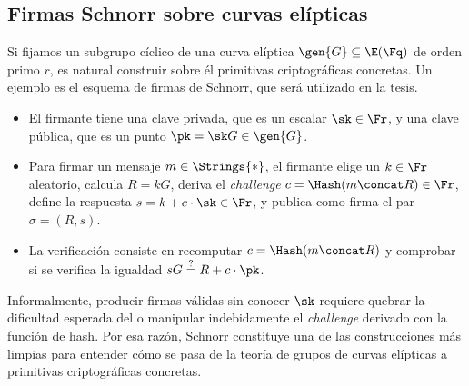 \subsection{Firmas Schnorr sobre curvas elípticas}

Si fijamos un subgrupo cíclico de una curva elíptica $\gen{G} \subseteq \E(\Fq)$ de orden primo $r$, es natural construir sobre él primitivas criptográficas concretas. Un ejemplo es el esquema de firmas de Schnorr, que será utilizado en la tesis.

\begin{itemize}[itemsep=0.1 cm]
	\item El firmante tiene una clave privada, que es un escalar $\sk \in \Fr$, y una clave pública, que es un punto $\pk = \sk G \in \gen{G}$.
	\item Para firmar un mensaje $m \in \Strings{*}$, el firmante elige un $k \in \Fr$ aleatorio, calcula
	$R = kG$, deriva el \textit{challenge} $c = \Hash(m \concat R) \in \Fr$, define la respuesta $s = k + c \cdot \sk \in \Fr$, y publica como firma el par $\sigma = (R,s)$.
	\item La verificación consiste en recomputar $c = \Hash(m \concat R)$ y comprobar si se verifica la igualdad $sG \stackrel{?}{=} R + c\cdot \pk$.
\end{itemize}

Informalmente, producir firmas válidas sin conocer $\sk$ requiere quebrar la dificultad esperada del \ECDLP o manipular indebidamente el \textit{challenge} derivado con la función de hash. Por esa razón, Schnorr constituye una de las construcciones más limpias para entender cómo se pasa de la teoría de grupos de curvas elípticas a primitivas criptográficas concretas.
